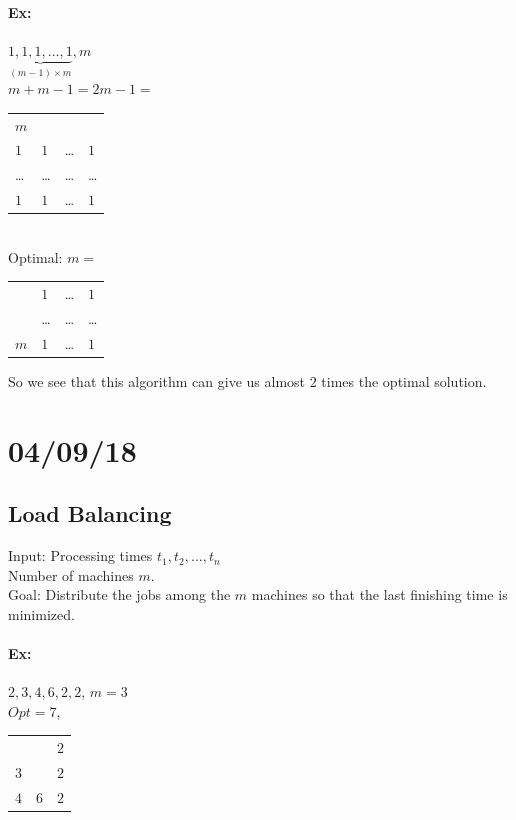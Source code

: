\documentclass[12 pt]{article}
\begin{document}
          \paragraph{Ex:} $\underbrace{1,1,1,\ldots,1}_{(m-1)\times
            m}, m$
          \\ $m+m-1 = 2m-1 =$
          \begin{tabular}{|l|l|l|l|}
            \hline $m$&&&
            \\ $1$ & $1$ & \ldots & $1$
            \\ \ldots & \ldots & \ldots & \ldots
            \\ $1$ & $1$ & \ldots & $1$
            \\ \hline
          \end{tabular}
          \\ Optimal: $m=$
          \begin{tabular}{|l|l|l|l|}
            \hline &$1$&\ldots&$1$
            \\ & \ldots & \ldots & \ldots
            \\ $m$ & $1$ & \ldots & $1$
            \\ \hline
          \end{tabular}
          So we see that this algorithm can give us almost $2$ times
          the optimal solution.
          \section{04/09/18}
          \subsection{Load Balancing}
          Input: Processing times $t_1, t_2, \ldots, t_n$
          \\ Number of machines $m$.
          \\ Goal: Distribute the jobs among the $m$ machines so that
          the last finishing time is minimized.
          \paragraph{Ex:} $2,3,4,6,2,2$, $m=3$
          \\ $Opt = 7$, 
          \begin{tabular}{|l |l |l|}
            \hline &&$2$
            \\ $3$ & & $2$
            \\ $4$ & $6$ & $2$
            \\ \hline
          \end{tabular}
\end{document}
